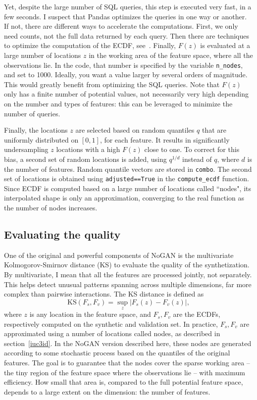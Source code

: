 \documentclass[oneside,10pt]{book}
\begin{document}
Yet, despite the large number of SQL queries, this step is executed very fast, in a few seconds. I suspect that Pandas optimizes the queries 
 in one way or another. If not, there are different ways to accelerate the computations. First, we only need counts, not the full data returned by each query. Then there are techniques to optimize the computation of the ECDF, see~\cite{putrider22}. Finally, $F(z)$ is evaluated
 at a large number of locations $z$ in the working area of the feature space, where all the observations lie. In the code, that number is specified by the variable \texttt{n\_nodes}, and set to 1000. Ideally, you want a value larger by several orders of magnitude. This would greatly benefit from optimizing the SQL queries. Note that $F(z)$ only has a finite number of potential values, not necessarily very high depending on the number and types of features: this can be leveraged to minimize the number of queries.

 Finally, the locations $z$ are selected based on random quantiles $q$ that are uniformly distributed on $[0, 1]$, for each feature.  It results in 
significantly undersampling $z$ locations with a high $F(z)$ close to one. To correct for this bias, a second set of random locations is added, using
  $q^{1/d}$ instead of $q$, where $d$ is the number of features. Random quantile vectors are stored in \texttt{combo}. The second set
 of locations is obtained using \texttt{adjusted==True} in the \texttt{compute\_ecdf} function. Since ECDF is computed based on a large number
 of locations called ``nodes", its interpolated shape is only an approximation, converging to the real function as the number of nodes increases. 
 
\subsection{Evaluating the quality}\label{evrd7hg}

One of the original and powerful components of NoGAN is the multivariate 
\textcolor{index}{Kolmogorov-Smirnov distance} (KS) to evaluate the quality of
 the synthetization. By multivariate, I mean that all the features are processed jointly, not separately. This helps detect unusual patterns spanning across multiple dimensions, far more complex than pairwise interactions. The KS distance is defined as
$$
\text{KS}(F_s, F_v) = \sup_{z} |F_s(z) - F_v(z)|,
$$
where $z$ is any location in the feature space, and $F_s, F_v$ are the ECDFs, respectively computed on the synthetic and validation set. 
In practice, $F_s,F_v$ are approximated using a number of locations called nodes, as described in section~\ref{iuc3id}. In the NoGAN version
 described here, these nodes are generated according to some stochastic process based on the quantiles of the original features. The goal is to guarantee
 that the nodes cover the sparse working area -- the tiny region of the feature space where the observations lie  -- with maximum efficiency.
 How small that area is, compared to the full potential feature space, depends to a large extent on the dimension: the number of features.
\end{document}
